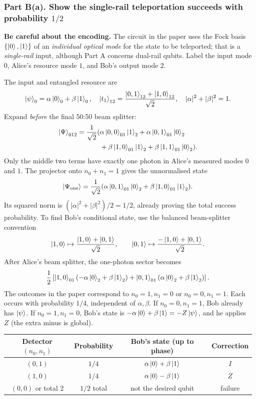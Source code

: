 \subsubsection*{Part B(a). Show the single-rail teleportation succeeds with probability $1/2$}
\textbf{Be careful about the encoding.} The circuit in the paper uses the Fock basis $\{\left\lvert 0\right\rangle,\left\lvert 1\right\rangle\}$ of an \emph{individual optical mode} for the state to be teleported; that is a \emph{single-rail} input, although Part A concerns dual-rail qubits. Label the input mode $0$, Alice's resource mode $1$, and Bob's output mode $2$.

The input and entangled resource are
\begin{equation}
\left\lvert \psi\right\rangle_0=\alpha\left\lvert 0\right\rangle_0+\beta\left\lvert 1\right\rangle_0,\quad
\left\lvert t_1\right\rangle_{12}=\frac{\left\lvert 0,1\right\rangle_{12}+\left\lvert 1,0\right\rangle_{12}}{\sqrt2},\quad
|\alpha|^2+|\beta|^2=1.
\end{equation}
Expand \emph{before} the final 50:50 beam splitter:
\begin{align}
\left\lvert \Psi\right\rangle_{012}=\frac1{\sqrt2}(&\alpha\left\lvert 0,0\right\rangle_{01}\left\lvert 1\right\rangle_2+\alpha\left\lvert 0,1\right\rangle_{01}\left\lvert 0\right\rangle_2\\
&+\beta\left\lvert 1,0\right\rangle_{01}\left\lvert 1\right\rangle_2+\beta\left\lvert 1,1\right\rangle_{01}\left\lvert 0\right\rangle_2).
\end{align}
Only the middle two terms have exactly one photon in Alice's measured modes $0$ and $1$. The projector onto $n_0+n_1=1$ gives the unnormalised state
\begin{equation}
\left\lvert \Psi_{\rm one}\right\rangle=\frac1{\sqrt2}(\alpha\left\lvert 0,1\right\rangle_{01}\left\lvert 0\right\rangle_2+\beta\left\lvert 1,0\right\rangle_{01}\left\lvert 1\right\rangle_2).
\end{equation}
Its squared norm is $(|\alpha|^2+|\beta|^2)/2=1/2$, already proving the total success probability. To find Bob's conditional state, use the balanced beam-splitter convention
\begin{equation}
\left\lvert 1,0\right\rangle\mapsto\frac{\left\lvert 1,0\right\rangle+\left\lvert 0,1\right\rangle}{\sqrt2},\qquad
\left\lvert 0,1\right\rangle\mapsto\frac{-\left\lvert 1,0\right\rangle+\left\lvert 0,1\right\rangle}{\sqrt2}.
\end{equation}
After Alice's beam splitter, the one-photon sector becomes
\begin{equation}
\frac12\left[\left\lvert 1,0\right\rangle_{01}(-\alpha\left\lvert 0\right\rangle_2+\beta\left\lvert 1\right\rangle_2)
+\left\lvert 0,1\right\rangle_{01}(\alpha\left\lvert 0\right\rangle_2+\beta\left\lvert 1\right\rangle_2)\right].
\end{equation}
The outcomes in the paper correspond to $n_0=1,n_1=0$ or $n_0=0,n_1=1$. Each occurs with probability $1/4$, independent of $\alpha,\beta$. If $n_0=0,n_1=1$, Bob already has $\left\lvert \psi\right\rangle$. If $n_0=1,n_1=0$, Bob's state is $-\alpha\left\lvert 0\right\rangle+\beta\left\lvert 1\right\rangle=-Z\left\lvert \psi\right\rangle$, and he applies $Z$ (the extra minus is global).
\begin{center}\small
\begin{tabular}{@{}cccc@{}}\toprule Detector $(n_0,n_1)$&Probability&Bob's state (up to phase)&Correction\\\midrule
$(0,1)$&$1/4$&$\alpha\left\lvert 0\right\rangle+\beta\left\lvert 1\right\rangle$&$I$\\
$(1,0)$&$1/4$&$\alpha\left\lvert 0\right\rangle-\beta\left\lvert 1\right\rangle$&$Z$\\
$(0,0)$ or total 2&$1/2$ total&not the desired qubit&failure\\\bottomrule
\end{tabular}\end{center}
